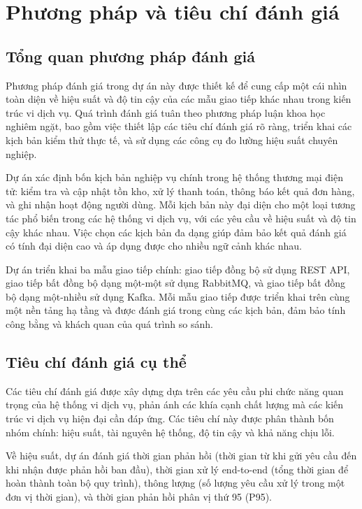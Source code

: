 \section{Phương pháp và tiêu chí đánh giá}

\subsection{Tổng quan phương pháp đánh giá}
Phương pháp đánh giá trong dự án này được thiết kế để cung cấp một cái nhìn toàn diện về hiệu suất và độ tin cậy của các mẫu giao tiếp khác nhau trong kiến trúc vi dịch vụ. Quá trình đánh giá tuân theo phương pháp luận khoa học nghiêm ngặt, bao gồm việc thiết lập các tiêu chí đánh giá rõ ràng, triển khai các kịch bản kiểm thử thực tế, và sử dụng các công cụ đo lường hiệu suất chuyên nghiệp.

Dự án xác định bốn kịch bản nghiệp vụ chính trong hệ thống thương mại điện tử: kiểm tra và cập nhật tồn kho, xử lý thanh toán, thông báo kết quả đơn hàng, và ghi nhận hoạt động người dùng. Mỗi kịch bản này đại diện cho một loại tương tác phổ biến trong các hệ thống vi dịch vụ, với các yêu cầu về hiệu suất và độ tin cậy khác nhau. Việc chọn các kịch bản đa dạng giúp đảm bảo kết quả đánh giá có tính đại diện cao và áp dụng được cho nhiều ngữ cảnh khác nhau.

Dự án triển khai ba mẫu giao tiếp chính: giao tiếp đồng bộ sử dụng REST API, giao tiếp bất đồng bộ dạng một-một sử dụng RabbitMQ, và giao tiếp bất đồng bộ dạng một-nhiều sử dụng Kafka. Mỗi mẫu giao tiếp được triển khai trên cùng một nền tảng hạ tầng và được đánh giá trong cùng các kịch bản, đảm bảo tính công bằng và khách quan của quá trình so sánh.

\subsection{Tiêu chí đánh giá cụ thể}
Các tiêu chí đánh giá được xây dựng dựa trên các yêu cầu phi chức năng quan trọng của hệ thống vi dịch vụ, phản ánh các khía cạnh chất lượng mà các kiến trúc vi dịch vụ hiện đại cần đáp ứng. Các tiêu chí này được phân thành bốn nhóm chính: hiệu suất, tài nguyên hệ thống, độ tin cậy và khả năng chịu lỗi.

Về hiệu suất, dự án đánh giá thời gian phản hồi (thời gian từ khi gửi yêu cầu đến khi nhận được phản hồi ban đầu), thời gian xử lý end-to-end (tổng thời gian để hoàn thành toàn bộ quy trình), thông lượng (số lượng yêu cầu xử lý trong một đơn vị thời gian), và thời gian phản hồi phân vị thứ 95 (P95).


